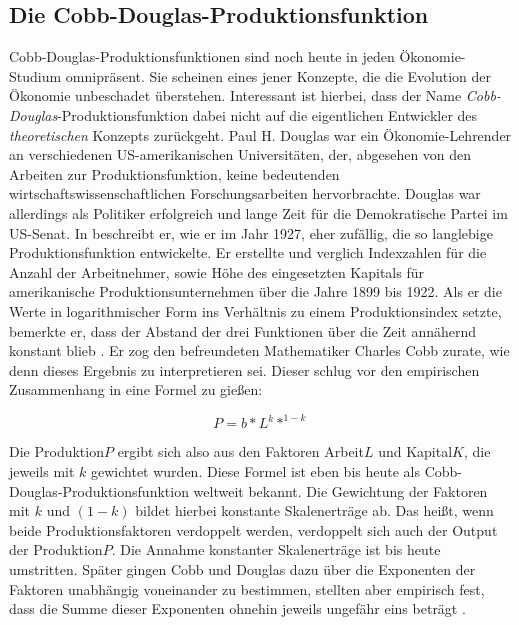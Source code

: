 \subsection{Die Cobb-Douglas-Produktionsfunktion} \label{sec: Cobb-Douglas-Produktionsfunktion}
Cobb-Douglas-Produktionsfunktionen sind noch heute in jeden Ökonomie-Studium omnipräsent. Sie scheinen eines jener Konzepte, die die Evolution der Ökonomie unbeschadet überstehen. Interessant ist hierbei, dass der Name \textit{Cobb-Douglas}-Produktionsfunktion dabei nicht auf die eigentlichen Entwickler des \textit{theoretischen} Konzepts zurückgeht. Paul H. Douglas war ein Ökonomie-Lehrender an verschiedenen US-amerikanischen Universitäten, der, abgesehen von den Arbeiten zur Produktionsfunktion, keine bedeutenden wirtschaftswissenschaftlichen Forschungsarbeiten hervorbrachte. Douglas war allerdings als Politiker erfolgreich und lange Zeit für die Demokratische Partei im US-Senat. In \textcite{Douglas1976} beschreibt er, wie er im Jahr 1927, eher zufällig, die so langlebige Produktionsfunktion entwickelte. Er erstellte und verglich Indexzahlen für die Anzahl der Arbeitnehmer, sowie Höhe des eingesetzten Kapitals für amerikanische Produktionsunternehmen über die Jahre 1899 bis 1922. Als er die Werte in logarithmischer Form ins Verhältnis zu einem Produktionsindex setzte, bemerkte er, dass der Abstand der drei Funktionen über die Zeit annähernd konstant blieb \parencite[S. 904]{Douglas1976}. Er zog den befreundeten Mathematiker Charles Cobb zurate, wie denn dieses Ergebnis zu interpretieren sei. Dieser schlug vor den empirischen Zusammenhang in eine Formel zu gießen:

$$P = b*L^k*^{1-k}$$

Die Produktion$P$ ergibt sich also aus den Faktoren Arbeit$L$ und Kapital$K$, die jeweils mit $k$ gewichtet wurden. Diese Formel ist eben bis heute als Cobb-Douglas-Produktionsfunktion weltweit bekannt. Die Gewichtung der Faktoren mit $k$ und $(1-k)$ bildet hierbei konstante Skalenerträge ab. Das heißt, wenn beide Produktionsfaktoren verdoppelt werden, verdoppelt sich auch der Output der Produktion$P$. Die Annahme konstanter Skalenerträge ist bis heute umstritten. Später gingen Cobb und Douglas dazu über die Exponenten der Faktoren unabhängig voneinander zu bestimmen, stellten aber empirisch fest, dass die Summe dieser Exponenten ohnehin jeweils ungefähr eins beträgt \parencite[S. 904]{Douglas1976}.

